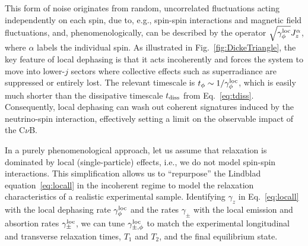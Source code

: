 \documentclass[aps,prd,10pt,twocolumn,superscriptaddress,floatfix,nofootinbib,amsmath,amssymb,altaffilletter,preprintnumbers]{revtex4-1}
\begin{document}
This form of noise originates from random, uncorrelated fluctuations acting independently on each spin, due to, e.g., spin-spin interactions and magnetic field fluctuations, and, phenomenologically, can be  described by the operator $\sqrt{\gamma_{\phi}^{\rm loc}}J_z^{\alpha}$, where $\alpha$ labels the individual spin. As illustrated in Fig.~\ref{fig:DickeTriangle}, the key feature of local dephasing is that it acts incoherently and forces the system to move into lower-$j$ sectors where collective effects such as superradiance are suppressed or entirely lost. The relevant timescale is $t_{\phi}\sim 1/\gamma_{\phi}^{\rm loc}$, which is easily much shorter than the dissipative timescale $t_{\rm diss}$ from Eq.~\eqref{eq:tdiss}.  Consequently, local dephasing can wash out coherent signatures induced by the neutrino-spin interaction, effectively setting a limit on the observable impact of the C$\nu$B.



In a purely phenomenological approach, let us assume that relaxation is dominated by local (single-particle) effects, i.e., we do not model spin-spin interactions. This simplification allows us to ``repurpose'' the Lindblad equation~\eqref{eq:locall} in the incoherent regime to model the relaxation characteristics of a realistic experimental sample.  Identifying $\gamma_z$ in Eq.~\eqref{eq:locall} with the local dephasing rate $\gamma^{\rm loc}_{\phi}$ and the rates $\gamma_\pm$ with the local  emission and absortion rates $\gamma^{\rm loc}_{\pm}$, we can tune  $\gamma_{\pm,\phi}^{\rm loc}$ to match the experimental longitudinal and transverse relaxation times, $T_1$ and $T_2$, and the final equilibrium state.
\end{document}
